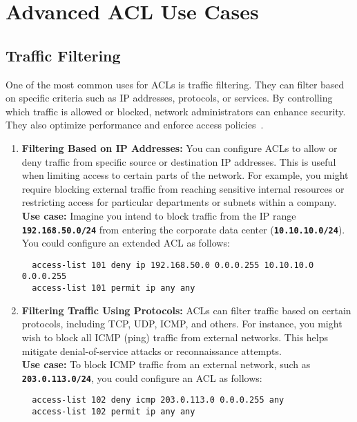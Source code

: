 \documentclass[11pt,a4paper]{article}
\begin{document}
\section*{Advanced ACL Use Cases}
    \subsection*{Traffic Filtering}
        One of the most common uses for ACLs is traffic filtering. They can filter based on specific criteria such as IP addresses, protocols, or services. By controlling which traffic is allowed or blocked, network administrators can enhance security. They also optimize performance and enforce access policies~\cite{Traffic-Filtering}.
            \begin{enumerate}
                \item \textbf{Filtering Based on IP Addresses:} You can configure ACLs to allow or deny traffic from specific source or destination IP addresses. This is useful when limiting access to certain parts of the network. For example, you might require blocking external traffic from reaching sensitive internal resources or restricting access for particular departments or subnets within a company.
                \\[1em]
                \textbf{Use case:} Imagine you intend to block traffic from the IP range \textbf{\lstinline{192.168.50.0/24}} from entering the corporate data center (\textbf{\lstinline{10.10.10.0/24}}). You could configure an extended ACL as follows:
\begin{lstlisting}
  access-list 101 deny ip 192.168.50.0 0.0.0.255 10.10.10.0 0.0.0.255
  access-list 101 permit ip any any
\end{lstlisting}


                \item \textbf{Filtering Traffic Using Protocols:} ACLs can filter traffic based on certain protocols, including TCP, UDP, ICMP, and others. For instance, you might wish to block all ICMP (ping) traffic from external networks. This helps mitigate denial-of-service attacks or reconnaissance attempts.
                \\[1em]
                \textbf{Use case:} To block ICMP traffic from an external network, such as \textbf{\lstinline{203.0.113.0/24}}, you could configure an ACL as follows:
\begin{lstlisting}
  access-list 102 deny icmp 203.0.113.0 0.0.0.255 any
  access-list 102 permit ip any any
\end{lstlisting}


\end{enumerate}
\end{document}
